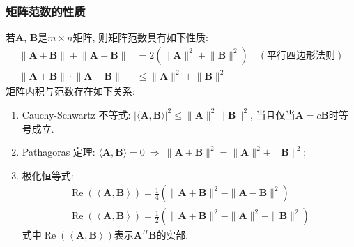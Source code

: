 \documentclass[lang=cn,10pt]{gorgeousnbook}
\numberwithin{equation}{section}%
\numberwithin{figure}{section}%
\begin{document}
\subsubsection{矩阵范数的性质}
若$\bm{A}$, $\bm{B}$是$m\times n $矩阵, 则矩阵范数具有如下性质:
\begin{equation}
\begin{aligned}\lVert \bm{A}+\bm{B}\rVert+\lVert \bm{A}-\bm{B}\rVert&=2(\lVert \bm{A}\rVert^2+\lVert \bm{B}\rVert^2)\quad(\text{平行四边形法则})\\\lVert \bm{A}+\bm{B}\rVert\cdot\lVert \bm{A}-\bm{B}\rVert&\leqslant\lVert \bm{A}\rVert^2+\lVert \bm{B}\rVert^2\end{aligned}
\end{equation}
矩阵内积与范数存在如下关系:
\begin{enumerate}[(1)]
\item Cauchy-Schwartz 不等式: $\left|\langle \bm{A},\bm{B}\rangle\right|^2\leqslant\|\bm{A}\|^2\|\bm{B}\|^2$, 当且仅当$\bm{A}=c\bm{B}$时等号成立.
\item Pathagoras 定理: $\langle \bm{A},\bm{B}\rangle=0\mathrm{~}\Rightarrow\mathrm{~}\|\bm{A}+\bm{B}\|^2=\|\bm{A}\|^2+\|\bm{B}\|^2$;
\item 极化恒等式: 
\begin{equation}
\begin{gathered}
\operatorname{Re}\left(\left<\bm{A},\bm{B}\right>\right) =\frac14\left(\|\boldsymbol{A}+\boldsymbol{B}\|^2-\|\boldsymbol{A}-\boldsymbol{B}\|^2\right) \\
\operatorname{Re}\left(\left<\bm{A},\bm{B}\right>\right) =\frac12\left(\|\boldsymbol{A}+\boldsymbol{B}\|^2-\|\boldsymbol{A}\|^2-\|\boldsymbol{B}\|^2\right) 
\end{gathered}
\end{equation}
式中$\operatorname{Re}\left(\left<\bm{A},\bm{B}\right>\right) $表示$\bm{A}^H\bm{B}$的实部.
\end{enumerate}
\end{document}
